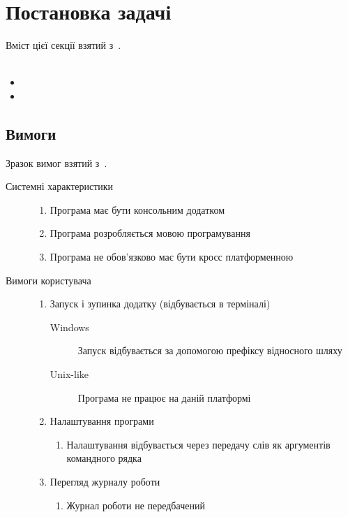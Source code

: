 \documentclass[../../document]{subfiles}
\begin{document}
	\chapter{Постановка задачі}
	Вміст цієї секції взятий з~\cite{CSHPiskunov}.\\
	\\
	\begin{itemize}
		\item
		\item
	\end{itemize}

	\section{Вимоги}
	Зразок вимог взятий з~\cite{kulikov}. 
	\begin{description}
		\item[Системні характеристики]\directenv%
			\begin{enumerate}
				\item Програма має бути консольним додатком
				\item Програма розробляється мовою програмування  
				\item Програма не обов'язково має бути кросс платформенною
			\end{enumerate}
		\item[Вимоги користувача]\directenv%
			\begin{enumerate}
				\item Запуск і зупинка додатку (відбувається в терміналі)
					\begin{description}
						\item[Windows]
							Запуск відбувається за допомогою префіксу відносного шляху 
						\item[Unix-like]
							Програма не працює на даній платформі
					\end{description}
				\item Налаштування програми
					\begin{enumerate}
						\item Налаштування відбувається через передачу слів як аргументів командного рядка
					\end{enumerate}
				\item Перегляд журналу роботи
					\begin{enumerate}
						\item Журнал роботи не передбачений
					\end{enumerate}

\end{enumerate}
\end{description}
\end{document}
